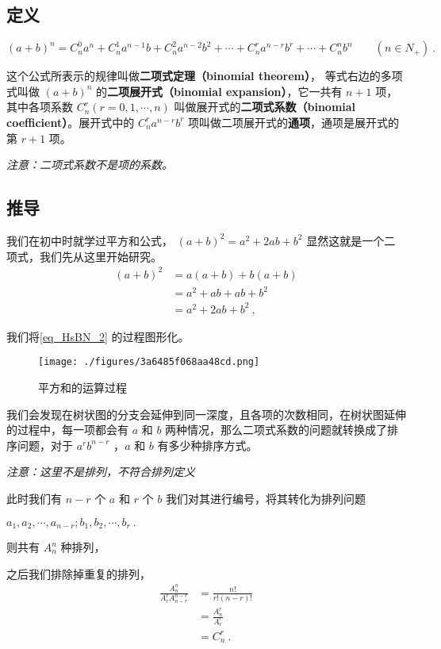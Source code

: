 

\subsection{定义}
\begin{equation}
(a + b)^n = C_n^0a^n + C_n^1a^{n- 1}b + C_n^2a^{n- 2}b^2 + \cdots + C_n^ra^{n-r}b^r + \cdots + C_n^nb^n \qquad (n\in N_{+})~.
\end{equation}

这个公式所表示的规律叫做\textbf{二项式定理（binomial theorem）}，
等式右边的多项式叫做 $(a+b)^n$ 的\textbf{二项展开式（binomial expansion）}，它一共有 $n+1$ 项，其中各项系数 $C_n^r(r = 0, 1, \cdots, n)$ 叫做展开式的\textbf{二项式系数（binomial coefficient）}。展开式中的 $C_n^ra^{n-r}b^r$ 项叫做二项展开式的\textbf{通项}，通项是展开式的第 $r+1$ 项。

\textsl{注意：二项式系数不是项的系数。}

\subsection{推导}
我们在初中时就学过平方和公式， $(a+b)^2 = a^2 + 2ab + b^2$ 显然这就是一个二项式，我们先从这里开始研究。
\begin{equation}\label{eq_HsBN_2}
\begin{aligned}
(a+b)^2 &= a(a + b) + b(a + b)\\
&= a^2 + ab + ab + b^2\\
&= a^2 + 2ab + b^2~,
\end{aligned}
\end{equation}

我们将\autoref{eq_HsBN_2} 的过程图形化。

\begin{figure}[ht]
\centering
\texttt{[image: ./figures/3a6485f068aa48cd.png]}
\caption{平方和的运算过程} \label{fig_HsBN_1}
\end{figure}

我们会发现在树状图的分支会延伸到同一深度，且各项的次数相同，在树状图延伸的过程中，每一项都会有 $a$ 和 $b$ 两种情况，那么二项式系数的问题就转换成了排序问题，对于 $a^rb^{n-r}$ ，$a$ 和 $b$ 有多少种排序方式。

\textsl{注意：这里不是排列，不符合排列定义}

此时我们有 $n-r$ 个 $a$ 和 $r$ 个 $b$ 我们对其进行编号，将其转化为排列问题

$a_1,a_2,\cdots,a_{n-r};b_1,b_2,\cdots,b_r~.$

 
则共有 $A_n^n$ 种排列，

之后我们排除掉重复的排列，
\begin{equation}
\begin{aligned}
\frac{A_n^n}{A_r^rA_{n-r}^{n-r}} &= \frac{n!}{r!(n-r)!}\\
&= \frac{A_n^r}{A_r^r}\\
&= C_n^r~.
\end{aligned}
\end{equation}
